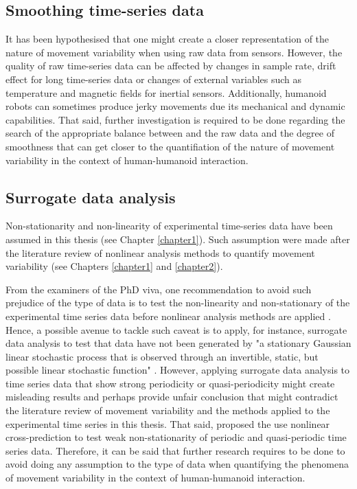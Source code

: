 \subsection*{Smoothing time-series data}
It has been hypothesised that one might create a closer 
representation of the nature of movement variability 
when using raw data from sensors.
However, the quality of raw time-series data can be affected 
by changes in sample rate, drift effect for long time-series data 
or changes of external variables such as 
temperature and magnetic fields for inertial sensors. 
Additionally, humanoid robots can sometimes produce
jerky movements due its mechanical and dynamic capabilities.
That said, further investigation is required to be done
regarding the search of the appropriate balance between 
and the raw data and the degree of smoothness 
that can get closer to the quantifiation of the nature of 
movement variability in the context of 
human-humanoid interaction. 

\subsection*{Surrogate data analysis}
Non-stationarity and non-linearity of experimental time-series data 
have been assumed in this thesis 
(see Chapter \ref{chapter1}).
Such assumption were made after the literature review of 
nonlinear analysis methods to quantify movement variability
(see Chapters \ref{chapter1} and \ref{chapter2}). 

From the examiners of the PhD viva, 
one recommendation to avoid such prejudice of the type of data  
is to test the non-linearity and non-stationary 
of the experimental time series data before nonlinear analysis 
methods are applied \citep{stam1998, schreiber2000}.
Hence, a possible avenue to tackle such caveat 
is to apply, for instance, surrogate data analysis to test that 
data have not been generated by "a stationary Gaussian linear
stochastic process that is observed through an invertible,
static, but possible linear stochastic function" 
\citep[p. 2]{schreiber2000}.
However, applying surrogate data analysis to time series data 
that show strong periodicity or quasi-periodicity 
might create misleading results and perhaps provide unfair 
conclusion that might contradict the literature review 
of movement variability and the methods applied 
to the experimental time series in this thesis.
That said, \cite{stam1998} proposed the use nonlinear 
cross-prediction to test weak non-stationarity 
of periodic and quasi-periodic time series data.
Therefore, it can be said that further research
requires to be done 
to avoid doing any assumption to the type of data
when quantifying the phenomena of movement 
variability in the context
of human-humanoid interaction.

